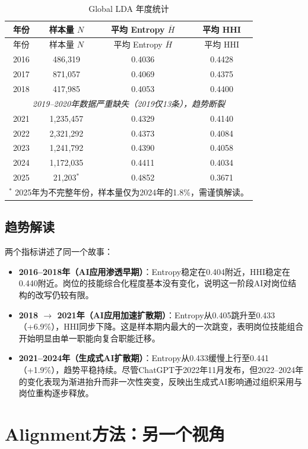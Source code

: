 \documentclass[12pt, a4paper, fontset=none]{ctexart}
\begin{document}
\begin{longtable}{cccc}
\caption{Global LDA 年度统计}\\
\toprule
年份 & 样本量 $N$ & 平均 Entropy $\overline{H}$ & 平均 HHI \\
\midrule
\endfirsthead
\toprule
年份 & 样本量 $N$ & 平均 Entropy $\overline{H}$ & 平均 HHI \\
\midrule
\endhead
2016 & 486,319 & 0.4036 & 0.4428 \\
2017 & 871,057 & 0.4069 & 0.4375 \\
2018 & 417,985 & 0.4053 & 0.4400 \\
\midrule
\multicolumn{4}{c}{\textit{2019--2020年数据严重缺失（2019仅13条），趋势断裂}} \\
\midrule
2021 & 1,235,457 & 0.4329 & 0.4140 \\
2022 & 2,321,292 & 0.4373 & 0.4084 \\
2023 & 1,241,792 & 0.4390 & 0.4058 \\
2024 & 1,172,035 & 0.4411 & 0.4034 \\
2025 & 21,203$^*$ & 0.4852 & 0.3671 \\
\bottomrule
\multicolumn{4}{l}{\footnotesize $^*$ 2025年为不完整年份，样本量仅为2024年的1.8\%，需谨慎解读。}
\end{longtable}

\subsection{趋势解读}

两个指标讲述了同一个故事：

\begin{itemize}
    \item \textbf{2016--2018年（AI应用渗透早期）}：Entropy稳定在0.404附近，HHI稳定在0.440附近。岗位的技能综合化程度基本没有变化，说明这一阶段AI对岗位结构的改写仍较有限。
    \item \textbf{2018 $\rightarrow$ 2021年（AI应用加速扩散期）}：Entropy从0.405跳升至0.433（+6.9\%），HHI同步下降。这是样本期内最大的一次跳变，表明岗位技能组合开始明显由单一职能向复合职能迁移。
    \item \textbf{2021--2024年（生成式AI扩散期）}：Entropy从0.433缓慢上行至0.441（+1.9\%），趋势平稳持续。尽管ChatGPT于2022年11月发布，但2022--2024年的变化表现为渐进抬升而非一次性突变，反映出生成式AI影响通过组织采用与岗位重构逐步释放。
\end{itemize}

\section{Alignment方法：另一个视角}
\end{document}
